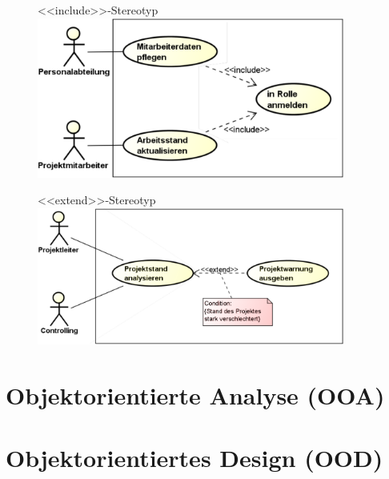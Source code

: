 \documentclass[11pt, a4paper]{article}
\begin{document}
\begin{figure}[ht]
    \centering
    \begin{minipage}[t]{0.45\textwidth}
        \raggedright <<include>>-Stereotyp \\
        \vspace{1em}
        \centering \includegraphics[width=0.9\textwidth]{UseCase-05.png}
    \end{minipage}
    \centering
    \begin{minipage}[t]{0.45\textwidth}
        \raggedright <<extend>>-Stereotyp \\
        \vspace{1em}
        \centering \includegraphics[width=0.9\textwidth]{UseCase-06.png}
    \end{minipage}
\end{figure}

\newpage




\section{Objektorientierte Analyse (OOA)}


\section{Objektorientiertes Design (OOD)} %
\end{document}
